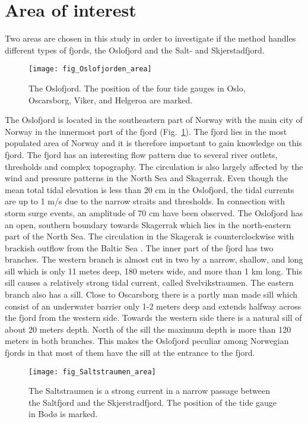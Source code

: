 \section{Area of interest}
Two areas are chosen in this study in order to investigate if the method handles different types of fjords, the Oslofjord and the Salt- and Skjerstadfjord.

\begin{figure}[!t]
\centering
\texttt{[image: fig\_Oslofjorden\_area]}
\caption{The Oslofjord. The position of the four tide gauges in Oslo, Oscarsborg, Viker, and Helgeroa are marked.}
\label{fig:area1}
\end{figure}

The Oslofjord is located in the southeastern part of Norway with the main city of Norway in the innermost part of the fjord (Fig.~\ref{fig:area1}). The fjord lies in the most populated area of Norway and it is therefore important to gain knowledge on this fjord. The fjord has an interesting flow pattern due to several river outlets, thresholds and complex topography. The circulation is also largely affected by the wind and pressure patterns in the North Sea and Skagerrak. 
Even though the mean total tidal elevation is less than 20 cm in the Oslofjord, the tidal currents are up to 1 m/s due to the narrow straits and thresholds. In connection with storm surge events, an amplitude of 70 cm have been observed. The Oslofjord has an open, southern boundary towards Skagerrak which lies in the north-eastern part of the North Sea. The circulation in the Skagerak is counterclockwise with brackish outflow from the Baltic Sea \cite[]{rodhe96,svendsen96}. 
The inner part of the fjord has two branches. The western branch is almost cut in two by a narrow, shallow, and long sill which is only 11 metes deep, 180 meters wide, and more than 1 km long. This sill causes a relatively strong tidal current, called Svelvikstraumen. The eastern branch also has a sill. Close to Oscarsborg there is a partly man made sill which consist of an underwater barrier only 1-2 meters deep and extends halfway across the fjord from the western side. Towards the western side there is a natural sill of about 20 meters depth. North of the sill the maximum depth is more than 120 meters in both branches.  This makes the Oslofjord peculiar among Norwegian fjords in that most of them have the sill at the entrance to the fjord.

\begin{figure}[!t]
\centering
\texttt{[image: fig\_Saltstraumen\_area]}
\caption{The Saltstraumen is a strong current in a narrow passage between the Saltfjord and the Skjerstradfjord. The position of the tide gauge in Bod{\o} is marked.}
\label{fig:area2}
\end{figure}

